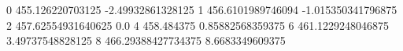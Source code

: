 0 455.126220703125 -2.49932861328125
1 456.6101989746094 -1.015350341796875
2 457.62554931640625 0.0
4 458.484375 0.85882568359375
6 461.1229248046875 3.49737548828125
8 466.29388427734375 8.6683349609375
